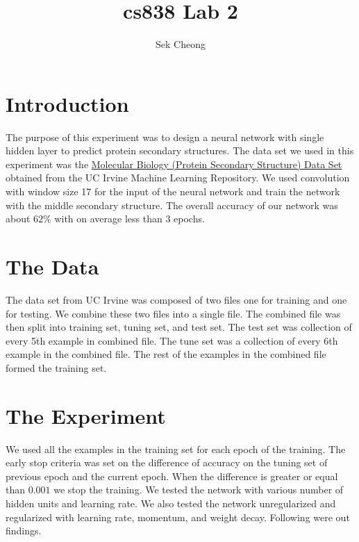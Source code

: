 \documentclass{article}
\begin{document}
\title{cs838 Lab 2}
\author{Sek Cheong}

\maketitle


\section{Introduction}
The purpose of this experiment was to design a neural network with single hidden layer to predict protein secondary structures. The data set we used in this experiment was the \href{https://archive.ics.uci.edu/ml/datasets/Molecular+Biology+(Protein+Secondary+Structure)}{Molecular Biology (Protein Secondary Structure) Data Set} obtained from the UC Irvine Machine Learning Repository. We used convolution with window size 17 for the input of the neural network and train the network with the middle secondary structure. The overall accuracy of our network was about $62\%$ with on average less than 3 epochs. 

\section{The Data}
The data set from UC Irvine was composed of two files one for training and one for testing. We combine these two files into a single file. The combined file was then split into training set, tuning set, and test set.  The test set was collection of every 5th example in combined file. The tune set was a collection of every 6th example in the combined file. The rest of the examples in the combined file formed the training set. 

\section{The Experiment}
We used all the examples in the training set for each epoch of the training. The early stop criteria was set on the difference of accuracy on the tuning set of previous epoch and the current epoch. When the difference is greater or equal than $0.001$ we stop the training. We tested the network with various number of hidden units and learning rate. We also tested the network unregularized and regularized with learning rate, momentum, and weight decay. Following were out findings. 
\end{document}
